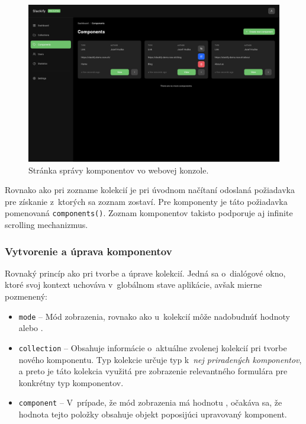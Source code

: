 \begin{figure}[H]
	\centering
	\includegraphics[scale=0.085]{obrazky-figures/screenshot_components}
	\caption{Stránka správy komponentov vo webovej konzole.}
\end{figure}

\noindent Rovnako ako pri zozname kolekcií je pri úvodnom načítaní odoslaná požiadavka pre získanie z~ktorých sa zoznam zostaví. Pre komponenty je táto požiadavka pomenovaná \texttt{components()}. Zoznam komponentov takisto podporuje aj infinite scrolling mechanizmus.

\subsubsection{Vytvorenie a úprava komponentov}
Rovnaký princíp ako pri tvorbe a úprave kolekcií. Jedná sa o~dialógové okno, ktoré svoj kontext uchováva v~globálnom stave aplikácie, avšak mierne pozmenený:

\begin{itemize}
	\item \texttt{mode} -- Mód zobrazenia, rovnako ako u~kolekcií môže nadobudnúť hodnoty  alebo .
	\item \texttt{collection} -- Obsahuje informácie o~aktuálne zvolenej kolekcií pri tvorbe nového komponentu. Typ kolekcie určuje typ k~\emph{nej priradených komponentov}, a preto je táto kolekcia využitá pre zobrazenie relevantného formulára pre konkrétny typ komponentov.
	\item \texttt{component} -- V~prípade, že mód zobrazenia má hodnotu , očakáva sa, že hodnota tejto položky obsahuje objekt poposijúci upravovaný komponent.
\end{itemize}

